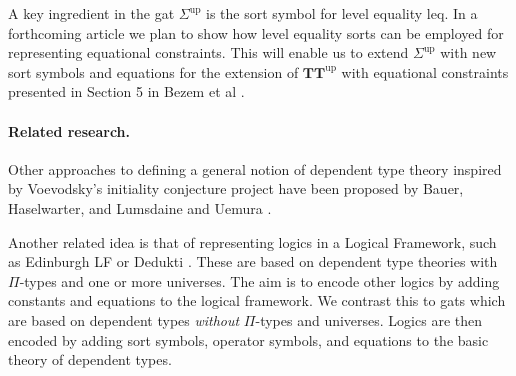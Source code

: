 \documentclass[11pt,a4paper]{article}
\theoremstyle{plain}
\theoremstyle{definition}
\def\leq{\mathrm{leq}}
\def\p{\mathrm{p}}
\def\q{\mathrm{q}}
\def\Sigmaint{{\Sigma^\mathrm{up}}}
\def\TTint{{\mathbf{TT}^\mathrm{up}}}
\begin{document}
A key ingredient in the gat $\Sigmaint$ is the sort symbol for level equality $\leq$. In a forthcoming article we plan to show how level equality sorts can be employed for representing equational constraints. This will enable us to extend $\Sigmaint$ with new sort symbols and equations for the extension of $\TTint$ with equational constraints presented in Section 5 in Bezem et al \cite{BezemCDE22}.

%
%


\paragraph{Related research.}
Other approaches to defining a general notion of dependent type theory inspired by Voevodsky's initiality conjecture project have been proposed by Bauer, Haselwarter, and Lumsdaine \cite{BauerHL20} and Uemura \cite{Uemura23}.

Another related idea is that of representing logics in a {Logical Framework}, such as Edinburgh LF \cite{harper-honsell-plotkin} or Dedukti \cite{dowek-dedukti}. These are based on dependent type theories with $\Pi$-types and one or more universes. The aim is to encode other logics by adding constants and equations to the logical framework. We contrast this to gats which are based on dependent types {\em without} $\Pi$-types and universes. Logics are then encoded by adding sort symbols, operator symbols, and equations to the basic theory of dependent types.
\end{document}
